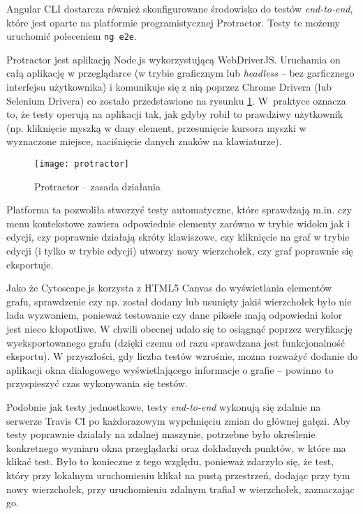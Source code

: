 Angular CLI dostarcza również skonfigurowane środowisko do testów \textit{end-to-end}, które jest oparte na platformie programistycznej Protractor. Testy te możemy uruchomić poleceniem \texttt{ng e2e}. 

Protractor jest aplikacją Node.js wykorzystującą WebDriverJS. Uruchamia on całą aplikację w przeglądarce (w trybie graficznym lub \textit{headless} -- bez garficznego interfejsu użytkownika) i komunikuje się z nią poprzez Chrome Drivera (lub Selenium Drivera) co zostało przedstawione na rysunku \ref{fig:protractor}. W~praktyce oznacza to, że testy operują na aplikacji tak, jak gdyby robił to prawdziwy użytkownik (np. kliknięcie myszką w dany element, przesunięcie kursora myszki w wyznaczone miejsce, naciśnięcie danych znaków na klawiaturze). 

\begin{figure}[H]
\centering
\texttt{[image: protractor]}
\caption{Protractor -- zasada działania}
\label{fig:protractor}
\end{figure}

Platforma ta pozwoliła stworzyć testy automatyczne, które sprawdzają m.in. czy menu kontekstowe zawiera odpowiednie elementy zarówno w trybie widoku jak i edycji, czy poprawnie działają skróty klawiszowe, czy kliknięcie na graf w trybie edycji (i tylko w trybie edycji) utworzy nowy wierzchołek, czy graf poprawnie się eksportuje. 

Jako że Cytoscape.js korzysta z HTML5 Canvas do wyświetlania elementów grafu, sprawdzenie czy np. został dodany lub usunięty jakiś wierzchołek było nie lada wyzwaniem, ponieważ testowanie czy dane piksele mają odpowiedni kolor jest nieco kłopotliwe. W chwili obecnej udało się to osiągnąć poprzez weryfikację wyeksportowanego grafu (dzięki czemu od razu sprawdzana jest funkcjonalność eksportu). W przyszłości, gdy liczba testów wzrośnie, można rozważyć dodanie do aplikacji okna dialogowego wyświetlającego informacje o grafie -- powinno to przyspieszyć czas wykonywania się testów.

Podobnie jak testy jednostkowe, testy \textit{end-to-end} wykonują się zdalnie na serwerze Travis CI po każdorazowym wypchnięciu zmian do głównej gałęzi. Aby testy poprawnie działały na zdalnej maszynie, potrzebne było określenie konkretnego wymiaru okna przeglądarki oraz dokładnych punktów, w które ma klikać test. Było to konieczne z tego względu, ponieważ zdarzyło się, że test, który przy lokalnym uruchomieniu klikał na pustą przestrzeń, dodając przy tym nowy wierzchołek, przy uruchomieniu zdalnym trafiał w wierzchołek, zaznaczając go. 

